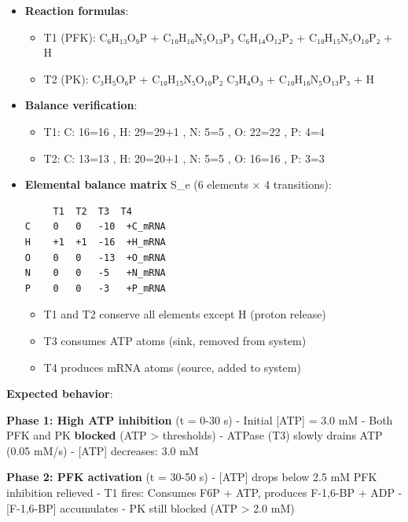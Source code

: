 \begin{itemize}
\item
  \textbf{Reaction formulas}:

  \begin{itemize}
  \tightlist
  \item
    T1 (PFK): C₆H₁₃O₉P + C₁₀H₁₆N₅O₁₃P₃ \textrightarrow C₆H₁₄O₁₂P₂ + C₁₀H₁₅N₅O₁₀P₂ + H
  \item
    T2 (PK): C₃H₅O₆P + C₁₀H₁₅N₅O₁₀P₂ \textrightarrow C₃H₄O₃ + C₁₀H₁₆N₅O₁₃P₃ + H
  \end{itemize}
\item
  \textbf{Balance verification}:

  \begin{itemize}
  \tightlist
  \item
    T1: C: 16=16 \checkmark, H: 29=29+1 \checkmark, N: 5=5 \checkmark, O: 22=22 \checkmark, P: 4=4 \checkmark
  \item
    T2: C: 13=13 \checkmark, H: 20=20+1 \checkmark, N: 5=5 \checkmark, O: 16=16 \checkmark, P: 3=3 \checkmark
  \end{itemize}
\item
  \textbf{Elemental balance matrix} S\_e (6 elements × 4 transitions):

\begin{lstlisting}
     T1  T2  T3  T4
C    0   0   -10  +C_mRNA
H    +1  +1  -16  +H_mRNA
O    0   0   -13  +O_mRNA
N    0   0   -5   +N_mRNA
P    0   0   -3   +P_mRNA
\end{lstlisting}

  \begin{itemize}
  \tightlist
  \item
    T1 and T2 conserve all elements except H (proton release)
  \item
    T3 consumes ATP atoms (sink, removed from system)
  \item
    T4 produces mRNA atoms (source, added to system)
  \end{itemize}
\end{itemize}

\textbf{Expected behavior}:

\textbf{Phase 1: High ATP inhibition} (t = 0-30 s) - Initial {[}ATP{]} =
3.0 mM - Both PFK and PK \textbf{blocked} (ATP \textgreater{}
thresholds) - ATPase (T3) slowly drains ATP (0.05 mM/s) - {[}ATP{]}
decreases: 3.0  mM

\textbf{Phase 2: PFK activation} (t = 30-50 s) - {[}ATP{]} drops below
2.5 mM \textrightarrow PFK inhibition relieved - T1 fires: Consumes F6P + ATP,
produces F-1,6-BP + ADP - {[}F-1,6-BP{]} accumulates - PK still blocked
(ATP \textgreater{} 2.0 mM)

